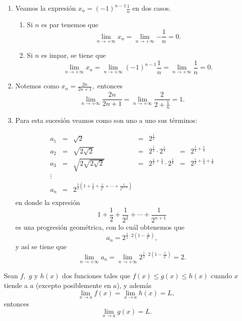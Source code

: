 \begin{example}
	\begin{enumerate}
		\item Veamos la expresi\'on \(x_n=(-1)^{n-1}\frac{1}{n}\) en dos casos.
			\begin{enumerate}
				\item Si \(n\) es par tenemos que
						\[
						\lim\limits_{n\to +\infty}{x_n}=\lim\limits_{n\to +\infty}{-\frac{1}{n}}=0.
						\]
				
				\item Si \(n\) es impar, se tiene que
						\[
						\lim\limits_{n\to +\infty}{x_n}=\lim\limits_{n\to +\infty}{(-1)^{n-1}\frac{1}{n}}=\lim\limits_{n\to+\infty}{\frac{1}{n}}=0.
						\]
			\end{enumerate}
		
		\item Notemos como \(x_n=\frac{2n}{2n+1},\) entonces 
		\[\lim\limits_{n\to+\infty}\frac{2n}{2n+1}=\lim\limits_{n\to+\infty}\frac{2}{2+\frac{1}{n}}=1.\]
		\item Para esta sucesi\'on veamos como son uno a uno sus t\'erminos:\newline
		
		\begin{equation*}
		\begin{array}{lclclcl}
		a_1&=&\sqrt{2}&=&2^{\frac{1}{2}}\\
		a_2&=&\sqrt{2\sqrt{2}}&=&2^{\frac{1}{2}}\cdot 2^{\frac{1}{4}}&=&2^{\frac{1}{2}+\frac{1}{4}}\\
		a_3&=&\sqrt{2\sqrt{2\sqrt{2}}}&=&2^{\frac{1}{2}+\frac{1}{4}}\cdot 2^{\frac{1}{8}}&=&2^{\frac{1}{2}+\frac{1}{4}+\frac{1}{8}}\\
		\vdots\\
		a_n&=&2^{\frac{1}{2}(1+\frac{1}{2}+\frac{1}{2^2}+\cdots+\frac{1}{2^{n+1}})}\\
		\end{array}
		\end{equation*}
		en donde la expresi\'on 
		\[1+\frac{1}{2}+\frac{1}{2^2}+\cdots+\frac{1}{2^{n+1}}\]
		es una progresi\'on geom\'etrica, con lo cu\'al obtenemos que
		\[a_n=2^{\frac{1}{2}\cdot 2(1-\frac{1}{2^n})},\]
		y as\'i se tiene que
		\[\lim\limits_{n\to+\infty}{a_n}=\lim\limits_{n\to+\infty}{2^{\frac{1}{2}\cdot 2(1-\frac{1}{2^n})}}=2.\]
		
	\end{enumerate}
\end{example}
\begin{property*}
	Sean \(f,\) \(g\) y \(h(x)\) dos funciones tales que \(f(x)\leq g(x)\leq h(x)\) cuando \(x\) tiende a \(a\) (excepto posiblemente en \(a\)), y adem\'as
	\[\lim\limits_{x\to a}f(x)=\lim\limits_{x\to a}h(x)=L,\]
	entonces
	\[\lim\limits_{x\to a}g(x)=L.\]
\end{property*}

